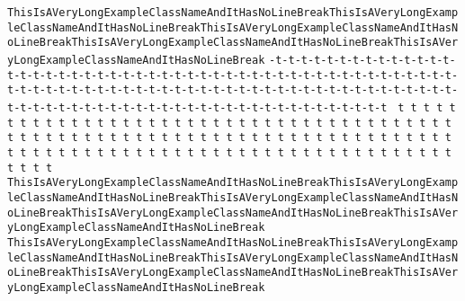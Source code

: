 \documentclass[12pt,a4paper,listof=totocnumbered,parskip=half]{scrreprt}
\newcommand{\code}[1]{\lstinline[style=inline]!#1!}
\newcommand{\class}[1]{\code{#1}}
\begin{document}
\class{ThisIsAVeryLongExampleClassNameAndItHasNoLineBreakThisIsAVeryLongExampleClassNameAndItHasNoLineBreakThisIsAVeryLongExampleClassNameAndItHasNoLineBreakThisIsAVeryLongExampleClassNameAndItHasNoLineBreakThisIsAVeryLongExampleClassNameAndItHasNoLineBreak} \class{-t-t-t-t-t-t-t-t-t-t-t-t-t-t-t-t-t-t-t-t-t-t-t-t-t-t-t-t-t-t-t-t-t-t-t-t-t-t-t-t-t-t-t-t-t-t-t-t-t-t-t-t-t-t-t-t-t-t-t-t-t-t-t-t-t-t-t-t-t-t-t-t-t-t-t-t-t-t-t-t-t-t-t-t-t-t-t-t-t-t-t-t-t-t-t-t-t-t-t-t-t-t-t-t-t-t-t-t-t-t-t-t-t-t}
\class{ t t t t t t t t t t t t t t t t t t t t t t t t t t t t t t t t t t t t t t t t t t t t t t t t t t t t t t t t t t t t t t t t t t t t t t t t t t t t t t t t t t t t t t t t t t t t t t t t t t t t t t t t t t t t t t t t t t} \class{ThisIsAVeryLongExampleClassNameAndItHasNoLineBreakThisIsAVeryLongExampleClassNameAndItHasNoLineBreakThisIsAVeryLongExampleClassNameAndItHasNoLineBreakThisIsAVeryLongExampleClassNameAndItHasNoLineBreakThisIsAVeryLongExampleClassNameAndItHasNoLineBreak} \class{ThisIsAVeryLongExampleClassNameAndItHasNoLineBreakThisIsAVeryLongExampleClassNameAndItHasNoLineBreakThisIsAVeryLongExampleClassNameAndItHasNoLineBreakThisIsAVeryLongExampleClassNameAndItHasNoLineBreakThisIsAVeryLongExampleClassNameAndItHasNoLineBreak}
\end{document}
